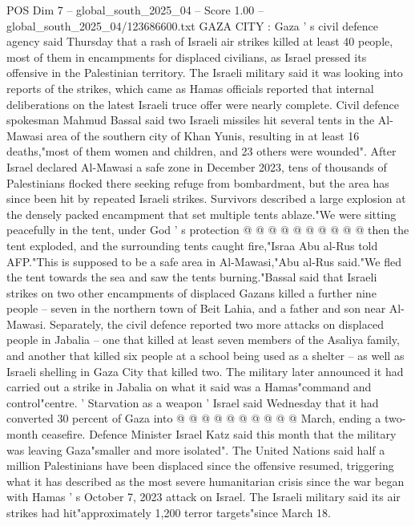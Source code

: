 \begin{textsample}{POS Dim 7 – global\_south\_2025\_04 – Score 1.00 – global\_south\_2025\_04/123686600.txt}  \label{ex:f7_pos_149}
GAZA CITY : Gaza ' s civil defence agency said Thursday that a rash of Israeli air strikes killed at least 40 people, most of them in encampments for displaced civilians, as Israel pressed its offensive in the Palestinian territory.
The Israeli military said it was looking into reports of the strikes, which came as Hamas officials reported that internal deliberations on the latest Israeli truce offer were nearly complete.
Civil defence spokesman Mahmud Bassal said two Israeli missiles hit several tents in the Al-Mawasi area of the southern city of Khan Yunis, resulting in at least 16 deaths,"most of them women and children, and 23 others were wounded".
After Israel declared Al-Mawasi a safe zone in December 2023, tens of thousands of Palestinians flocked there seeking refuge from bombardment, but the area has since been hit by repeated Israeli strikes.
Survivors described a large explosion at the densely packed encampment that set multiple tents ablaze."We were sitting peacefully in the tent, under God ' s protection @ @ @ @ @ @ @ @ @ @ then the tent exploded, and the surrounding tents caught fire,"Israa Abu al-Rus told AFP."This is supposed to be a safe area in Al-Mawasi,"Abu al-Rus said."We fled the tent towards the sea and saw the tents burning."Bassal said that Israeli strikes on two other encampments of displaced Gazans killed a further nine people -- seven in the northern town of Beit Lahia, and a father and son near Al-Mawasi.
Separately, the civil defence reported two more attacks on displaced people in Jabalia -- one that killed at least seven members of the Asaliya family, and another that killed six people at a school being used as a shelter -- as well as Israeli shelling in Gaza City that killed two.
The military later announced it had carried out a strike in Jabalia on what it said was a Hamas"command and control"centre. ' Starvation as a weapon ' Israel said Wednesday that it had converted 30 percent of Gaza into @ @ @ @ @ @ @ @ @ @ March, ending a two-month ceasefire.
Defence Minister Israel Katz said this month that the military was leaving Gaza"smaller and more isolated".
The United Nations said half a million Palestinians have been displaced since the offensive resumed, triggering what it has described as the most severe humanitarian crisis since the war began with Hamas ' s October 7, 2023 attack on Israel.
The Israeli military said its air strikes had hit"approximately 1,200 terror targets"since March 18.

\end{textsample}
